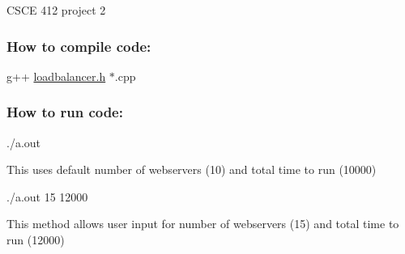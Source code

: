 C\+S\+CE 412 project 2

\subsubsection*{How to compile code\+:}

g++ \hyperlink{loadbalancer_8h}{loadbalancer.\+h} $\ast$.cpp

\subsubsection*{How to run code\+:}

./a.out

This uses default number of webservers (10) and total time to run (10000)

./a.out 15 12000

This method allows user input for number of webservers (15) and total time to run (12000) 